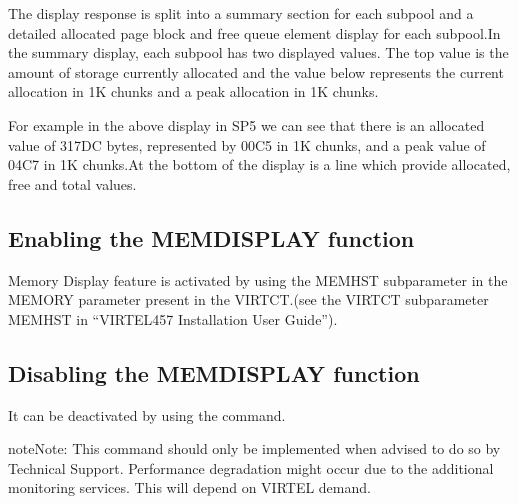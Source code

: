 \documentclass[letterpaper,10pt,english]{sphinxmanual}
\begin{document}
The display response is split into a summary section for each subpool and a detailed allocated page block and free queue element display for each subpool.In the summary display, each subpool has two displayed values. The top value is the amount of storage currently allocated and the value below represents the current allocation in 1K chunks and a peak allocation in 1K chunks.

For example in the above display in SP5 we can see that there is an allocated value of 317DC bytes, represented by 00C5 in 1K chunks, and a peak value of 04C7 in 1K chunks.At the bottom of the display is a line which provide allocated, free and total values.


\subsection{Enabling the MEMDISPLAY function}
\label{\detokenize{audit_operations_ and_performance:enabling-the-memdisplay-function}}\label{\detokenize{audit_operations_ and_performance:index-12}}
Memory Display feature is activated by using the MEMHST subparameter in the MEMORY parameter present in the VIRTCT.(see the VIRTCT subparameter MEMHST in “VIRTEL457 Installation User Guide”).


\subsection{Disabling the MEMDISPLAY function}
\label{\detokenize{audit_operations_ and_performance:index-13}}\label{\detokenize{audit_operations_ and_performance:disabling-the-memdisplay-function}}
It can be deactivated by using the command.

\begin{sphinxVerbatim}[commandchars=\\\{\}]
 
\end{sphinxVerbatim}

\begin{sphinxadmonition}{note}{Note:}
This command should only be implemented when advised to do so by Technical Support. Performance degradation might occur due to the additional monitoring services. This will depend on VIRTEL demand.
\end{sphinxadmonition}
\end{document}
